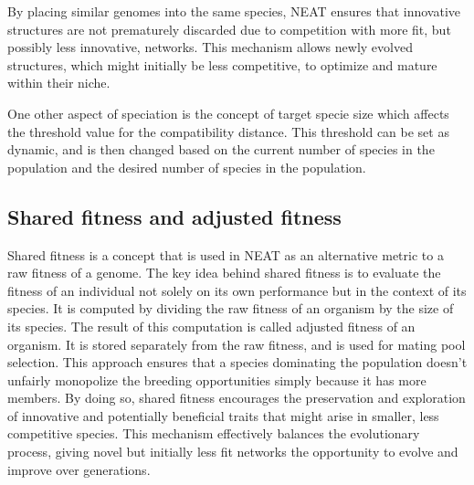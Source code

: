 \documentclass{article}
\begin{document}
By placing similar genomes into the same species, NEAT ensures that innovative structures are not prematurely discarded due to competition with more fit,
but possibly less innovative, networks.
This mechanism allows newly evolved structures, which might initially be less competitive, to optimize and mature within their niche.

One other aspect of speciation is the concept of target specie size which affects the threshold value for the compatibility distance.
This threshold can be set as dynamic, and is then changed based on the current number of species in the population and
the desired number of species in the population.

\subsection{Shared fitness and adjusted fitness}
Shared fitness is a concept \cite{Grefenstette_2013} that is used in NEAT as an alternative metric to a raw fitness of a genome.
The key idea behind shared fitness is to evaluate the fitness of an individual not solely on its own performance but in the context of its species.
It is computed by dividing the raw fitness of an organism by the size of its species.
The result of this computation is called adjusted fitness of an organism. It is stored separately from the raw fitness, and is used for mating pool selection.
This approach ensures that a species dominating the population doesn't unfairly monopolize the breeding opportunities simply because it has more members.
By doing so, shared fitness encourages the preservation and exploration of innovative and potentially beneficial traits that might arise in smaller,
less competitive species. This mechanism effectively balances the evolutionary process,
giving novel but initially less fit networks the opportunity to evolve and improve over generations.
\end{document}
